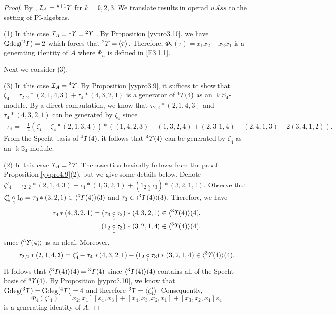 \documentclass{amsart}
\theoremstyle{definition}
\theoremstyle{remark}
\numberwithin{equation}{section}
\def\S{\mathbb{S}}
\def\gd{\operatorname{Gdeg}}
\newcommand{\lr}[1]{\langle #1 \rangle}
\newcommand{\ucr}[1]{\underset{#1}{\circ}}
\newcommand{\up}[1]{{^{#1}{\it \!\Upsilon}}}
\def \uas{u\mathcal{A}ss}
\def \I{\mathcal{I}}
\def \S{\mathbb{S}}
\begin{document}
\begin{proof}
By \cite[Theorem 0.7]{BYZ}, $\I_{A}=\up{k+1}$ for $k=0,2,3$. We
translate results in operad $\uas$ to the setting of PI-algebras.

(1) In this case $\I_A=\up{1}=\up{2}$ \cite[Lemma 3.8]{BYZ}.
By Proposition \ref{yypro3.10}, we have $\gd(\up{2})=2$ which forces
that $\up{2}=\lr{\tau}$. Therefore, $\Phi_2(\tau)=x_1x_2-x_2x_1$ is a 
generating identity of $A$ where $\Phi_n$ is defined in \eqref{E3.1.1}.

Next we consider (3).

(3) In this case $\I_A=\up{4}$. By Proposition 
\ref{yypro3.9}, it suffices to show that 
$\zeta_4=\tau_{2, 2}\ast (2, 1, 4, 3)+\tau_4\ast (4, 3, 2, 1)$ is 
a generator of $\up{4}(4)$ as an $\Bbbk\S_4$-module.
By a direct computation, we know that $\tau_{2, 2}\ast (2, 1, 4, 3)$ 
and $\tau_4\ast (4, 3, 2, 1)$ can be generated by $\zeta_4$ since
\begin{align*}
\tau_4=& \frac{1}{4}(\zeta_4+\zeta_4\ast 
(2, 1, 3, 4))\ast((1,4,2,3)-(1,3,2,4)+(2,3,1,4)-(2,4,1,3)-2(3, 4, 1, 2)).
\end{align*}
From the Specht basis of $\up{4}(4)$, it follows that $\up{4}(4)$ 
can be generated by $\zeta_4$ as an $\Bbbk\S_4$-module.

(2) In this case $\I_{A}=\up{3}$. The assertion basically follows 
from the proof Proposition \ref{yypro4.9}(2), but we give some 
details below. Denote $\zeta'_4=\tau_{2, 2}\ast (2, 1, 4, 3)
+\tau_{4}\ast (4, 3, 2, 1)+(1_2\ucr{1}\tau_3)\ast (3, 2, 1, 4)$. 
Observe that $\zeta'_4\ucr{4} 1_0=\tau_3\ast (3, 2, 1)\in 
\lr{\up{3}(4)}(3)$ and $\tau_3\in \lr{\up{3}(4)}(3)$.
Therefore, we have 
\begin{align*}
\tau_4\ast (4, 3, 2, 1)=(\tau_3\ucr{1}\tau_2)\ast (4, 3, 2, 1)
  \in \lr{\up{3}(4)}(4),\\
(1_2\ucr{1}\tau_3)\ast (3, 2, 1, 4) \in \lr{\up{3}(4)}(4).
\end{align*}
since $\lr{\up{3}(4)}$ is an ideal. Moreover, 
\[\tau_{2, 2}\ast (2, 1, 4, 3)=\zeta'_4-\tau_4\ast (4, 3, 2, 1)
-(1_2\ucr{1}\tau_3)\ast (3, 2, 1, 4)\in \lr{\up{3}(4)}(4).\]
It follows that $\lr{\up{3}(4)}(4)=\up{3}(4)$ since 
$\lr{\up{3}(4)}(4)$ contains all of the Specht basis of $\up{4}(4)$.
By Proposition \ref{yypro3.10}, 
we know that $\gd(\up{3})=\gd(\up{4})=4$ and therefore 
$\up{3}=\lr{\zeta'_4}$. 
Consequently, 
\[\Phi_4(\zeta'_4)=[x_2, x_1][x_4, x_3]
+[x_4, x_3, x_2, x_1]+[x_3, x_2, x_1]x_4\]
is a generating identity of $A$.
\end{proof}
\end{document}
